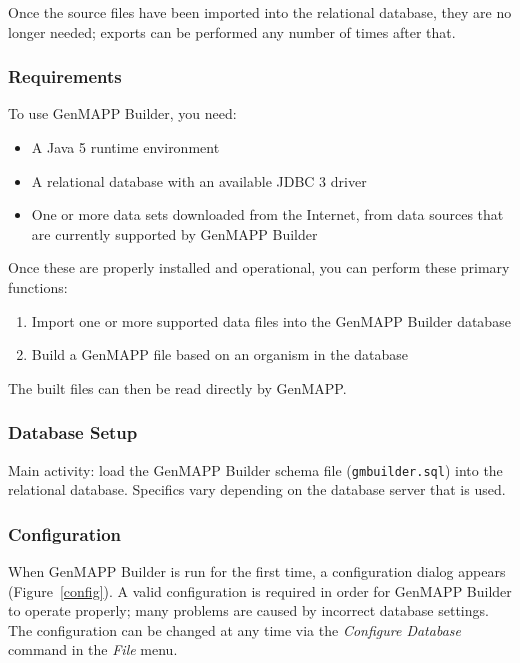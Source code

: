 \documentclass[11pt]{article}
\begin{document}
Once the source files have been imported into the relational database, they are no longer needed; exports can be performed any number of times after that.

\subsubsection{Requirements}

To use GenMAPP Builder, you need:
\begin{itemize}
\item A Java 5 runtime environment
\item A relational database with an available JDBC 3 driver
\item One or more data sets downloaded from the Internet, from data sources that are currently supported by GenMAPP Builder
\end{itemize}
Once these are properly installed and operational, you can perform these primary functions:
\begin{enumerate}
\item Import one or more supported data files into the GenMAPP Builder database
\item Build a GenMAPP file based on an organism in the database
\end{enumerate}
The built files can then be read directly by GenMAPP.

\subsubsection{Database Setup}

Main activity: load the GenMAPP Builder schema file (\texttt{gmbuilder.sql}) into the relational database.  Specifics vary depending on the database server that is used.

\subsubsection{Configuration}

When GenMAPP Builder is run for the first time, a configuration dialog appears (Figure~\ref{config}).  A valid configuration is required in order for GenMAPP Builder to operate properly; many problems are caused by incorrect database settings.  The configuration can be changed at any time via the \textsl{Configure Database} command in the \textsl{File} menu.
\end{document}
